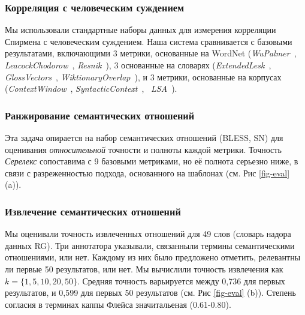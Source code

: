 \documentclass[a4paper,10pt,twoside]{article}
\begin{document}
\subsubsection{Корреляция с человеческим суждением} Мы использовали стандартные наборы данных для измерения корреляции Спирмена с человеческим суждением. Наша система сравнивается с базовыми результатами, включающими 3 метрики, основанные на WordNet (\textit{WuPalmer}~\cite{wu1994verbs}, \textit{LeacockChodorow}~\cite{leacock1998}, \textit{Resnik}~\cite{resnik1995}), 3 основанные на словарях (\textit{ExtendedLesk}~\cite{banerjee2003extended}, \textit{GlossVectors}~\cite{patwardhan2006using}, \textit{WiktionaryOverlap}~\cite{zesch2008extracting}), и 3 метрики, основанные на корпусах (\textit{ContextWindow}~\cite{cruys2010mining}, \textit{SyntacticContext}~\cite{cruys2010mining}, ~\textit{LSA}~\cite{landauer1998introduction}).

\subsubsection{Ранжирование семантических отношений} Эта задача опирается на набор семантических отношений (BLESS,  SN) для оценивания \textit{относительной} точности и полноты каждой метрики. Точность \textit{Серелекс}  сопоставима с 9 базовыми метриками, но её полнота серьезно ниже, в связи с разреженностью подхода, основанного на шаблонах (см. Рис \ref{fig-eval} (a)).

\subsubsection{Извлечение семантических отношений} Мы оценивали точность извлеченных отношений для 49 слов (словарь надора данных RG). Три аннотатора указывали, связанныли термины семантическими отношениями, или нет. Каждому из них было предложено отметить, релевантны ли первые 50 результатов, или нет. Мы вычислили точность извлечения как $k = \{1, 5, 10, 20, 50\}$. Средняя точность варьируется между 0,736 для первых результатов, и 0,599 для первых 50 результатов (см. Рис \ref{fig-eval} (b)). Степень согласия в терминах каппы Флейса значитальеная (0.61-0.80).

\end{document}

